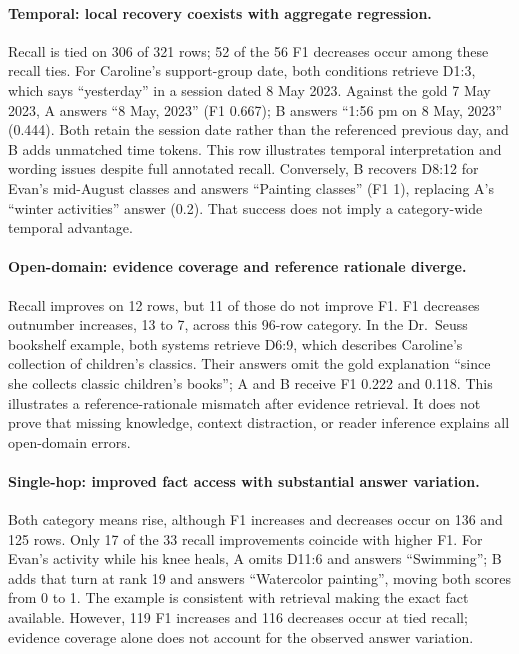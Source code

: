 \documentclass[a4paper,twoside]{article}
\begin{document}
\paragraph{Temporal: local recovery coexists with aggregate regression.}
Recall is tied on 306 of 321 rows; 52 of the 56 F1 decreases occur among
these recall ties. For Caroline's support-group date, both conditions retrieve
D1:3, which says ``yesterday'' in a session dated 8 May 2023. Against the gold
7 May 2023, A answers ``8 May, 2023'' (F1 0.667); B answers
``1:56 pm on 8 May, 2023'' (0.444). Both retain the session date rather than
the referenced previous day, and B adds unmatched time tokens. This row
illustrates temporal interpretation and wording issues despite full annotated
recall. Conversely, B recovers D8:12 for Evan's mid-August classes and answers
``Painting classes'' (F1 1), replacing A's ``winter activities'' answer
(0.2). That success does not imply a category-wide temporal advantage.

\paragraph{Open-domain: evidence coverage and reference rationale diverge.}
Recall improves on 12 rows, but 11 of those do not improve F1. F1 decreases
outnumber increases, 13 to 7, across this 96-row category. In the Dr.~Seuss
bookshelf example, both systems retrieve D6:9, which describes Caroline's
collection of children's classics. Their answers omit the gold explanation
``since she collects classic children's books''; A and B receive F1 0.222
and 0.118. This illustrates a reference-rationale mismatch after evidence
retrieval. It does not prove that missing knowledge, context distraction,
or reader inference explains all open-domain errors.

\paragraph{Single-hop: improved fact access with substantial answer variation.}
Both category means rise, although F1 increases and decreases occur on
136 and 125 rows. Only 17 of the 33 recall improvements coincide with
higher F1. For Evan's activity while his knee heals, A omits D11:6 and
answers ``Swimming''; B adds that turn at rank 19 and answers
``Watercolor painting'', moving both scores from 0 to 1. The example is
consistent with retrieval making the exact fact available. However, 119 F1
increases and 116 decreases occur at tied recall; evidence coverage alone
does not account for the observed answer variation.
\end{document}
